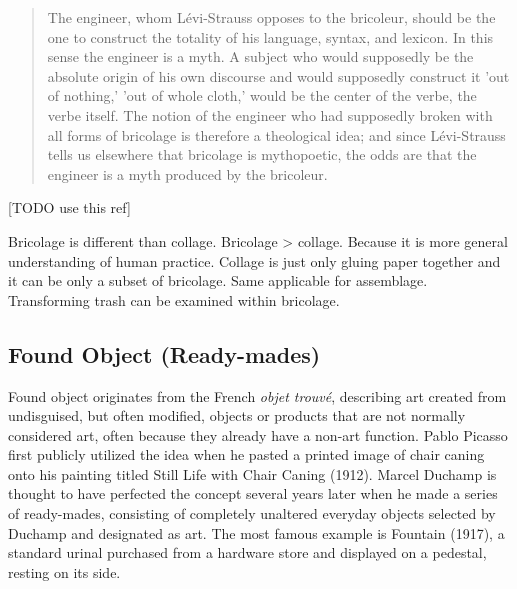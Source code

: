 \begin{quote}
The engineer, whom Lévi-Strauss opposes to the bricoleur, should be the one to construct the totality of his language, syntax, and lexicon. In this sense the engineer is a myth. A subject who would supposedly be the absolute origin of his own discourse and would supposedly construct it 'out of nothing,' 'out of whole cloth,' would be the center of the verbe, the verbe itself. The notion of the engineer who had supposedly broken with all forms of bricolage is therefore a theological idea; and since Lévi-Strauss tells us elsewhere that bricolage is mythopoetic, the odds are that the engineer is a myth produced by the bricoleur.\cite{derrida1993structure}
\end{quote}

[TODO use this ref]\cite{strasser1999waste}

Bricolage is different than collage. Bricolage > collage. Because it is more general understanding of human practice. Collage is just only gluing paper together and it can be only a subset of bricolage. Same applicable for assemblage. Transforming trash can be examined within bricolage. 


\subsection{Found Object (Ready-mades)}
Found object originates from the French \textit{objet trouvé}, describing art created from undisguised, but often modified, objects or products that are not normally considered art, often because they already have a non-art function. Pablo Picasso first publicly utilized the idea when he pasted a printed image of chair caning onto his painting titled Still Life with Chair Caning (1912). Marcel Duchamp is thought to have perfected the concept several years later when he made a series of ready-mades, consisting of completely unaltered everyday objects selected by Duchamp and designated as art. The most famous example is Fountain (1917), a standard urinal purchased from a hardware store and displayed on a pedestal, resting on its side.



